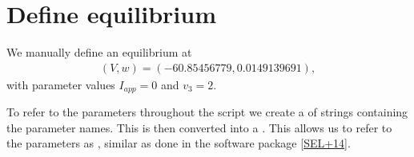 \documentclass[letterpaper,10pt,english]{jupyterBook}
\begin{document}
\begin{sphinxVerbatim}[commandchars=\\\{\}]
\end{sphinxVerbatim}


\section{Define equilibrium}
\label{\detokenize{Morris-Lecar:define-equilibrium}}
\sphinxAtStartPar
We manually define an equilibrium at
\begin{equation}\label{equation:Morris-Lecar:eq:MorrisLecar:equilibrium}
\begin{split}(V,w) = (-60.85456779, 0.0149139691),\end{split}
\end{equation}
\sphinxAtStartPar
with parameter values \(I_{app}=0\) and \(v_3 = 2\).

\sphinxAtStartPar
To refer to the parameters throughout the script we create a  of
strings containing the parameter names. This is then converted into a
. This allows us to refer to the parameters as ,
similar as done in the software package  {[}\hyperlink{cite.references:id21}{SEL+14}{]}.

\begin{sphinxVerbatim}[commandchars=\\\{\}]
\PYG{p}{[}\PYG{p}{]}
\PYG{p}{[}\PYG{p}{]}
\end{sphinxVerbatim}
\end{document}

